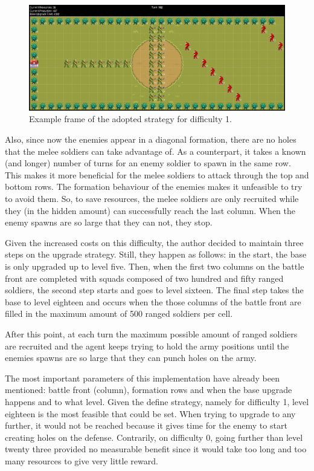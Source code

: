 \documentclass[conference]{IEEEtran}
\begin{document}
\begin{figure}[htbp]
    \centering
    \includegraphics[width=\textwidth]{imgs/dif1_formattions.png}
    \caption{Example frame of the adopted strategy for difficulty 1.}
    \label{fig:dif1_formattions}
\end{figure}

Also, since now the enemies appear in a diagonal formation, there are no holes that the melee soldiers can take advantage of. As a counterpart, it takes a known (and longer) number of turns for an enemy soldier to spawn in the same row. This makes it more beneficial for the melee soldiers to attack through the top and bottom rows. The formation behaviour of the enemies makes it unfeasible to try to avoid them. So, to save resources, the melee soldiers are only recruited while they (in the hidden amount) can successfully reach the last column. When the enemy spawns are so large that they can not, they stop. 

Given the increased costs on this difficulty, the author decided to maintain three steps on the upgrade strategy. Still, they happen as follows: in the start, the base is only upgraded up to level five. Then, when the first two columns on the battle front are completed with squads composed of two hundred and fifty ranged soldiers, the second step starts and goes to level sixteen. The final step takes the base to level eighteen and occurs when the those columns of the battle front are filled in the maximum amount of 500 ranged soldiers per cell.

After this point, at each turn the maximum possible amount of ranged soldiers are recruited and the agent keeps trying to hold the army positions until the enemies spawns are so large that they can punch holes on the army.

The most important parameters of this implementation have already been mentioned: battle front (column), formation rows and when the base upgrade happens and to what level. Given the define strategy, namely for difficulty 1, level eighteen is the most feasible that could be set. When trying to upgrade to any further, it would not be reached because it gives time for the enemy to start creating holes on the defense. Contrarily, on difficulty 0, going further than level twenty three provided no measurable benefit since it would take too long and too many resources to give very little reward. 
\end{document}
